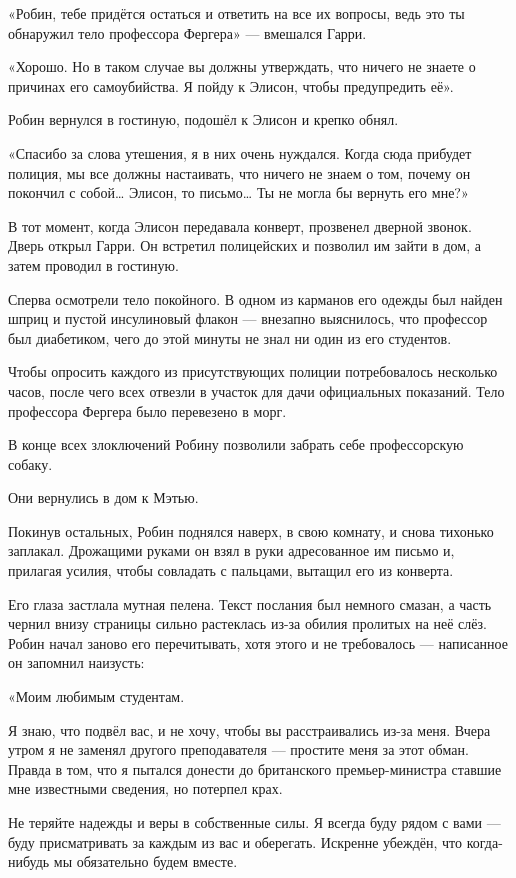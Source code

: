 \documentclass[a5paper, 9pt,
final, openany, twoside=true]{memoir}
\begin{document}
«Робин, тебе придётся остаться и ответить на все их вопросы, ведь это ты обнаружил тело профессора Фергера» — вмешался Гарри.

«Хорошо. Но в таком случае вы должны утверждать, что ничего не знаете о причинах его самоубийства. Я пойду к Элисон, чтобы предупредить её».

Робин вернулся в гостиную, подошёл к Элисон и крепко обнял.

«Спасибо за слова утешения, я в них очень нуждался. Когда сюда прибудет полиция, мы все должны настаивать, что ничего не знаем о том, почему он покончил с собой… Элисон, то письмо… Ты не могла бы вернуть его мне?»

В тот момент, когда Элисон передавала конверт, прозвенел дверной звонок. Дверь открыл Гарри. Он встретил полицейских и позволил им зайти в дом, а затем проводил в гостиную.

Сперва осмотрели тело покойного. В одном из карманов его одежды был найден шприц и пустой инсулиновый флакон — внезапно выяснилось, что профессор был диабетиком, чего до этой минуты не знал ни один из его студентов.

Чтобы опросить каждого из присутствующих полиции потребовалось несколько часов, после чего всех отвезли в участок для дачи официальных показаний. Тело профессора Фергера было перевезено в морг.

В конце всех злоключений Робину позволили забрать себе профессорскую собаку.\bigskip

Они вернулись в дом к Мэтью.

Покинув остальных, Робин поднялся наверх, в свою комнату, и снова тихонько заплакал. Дрожащими руками он взял в руки адресованное им письмо и, прилагая усилия, чтобы совладать с пальцами, вытащил его из конверта.

Его глаза застлала мутная пелена. Текст послания был немного смазан, а часть чернил внизу страницы сильно растеклась из-за обилия пролитых на неё слёз. Робин начал заново его перечитывать, хотя этого и не требовалось — написанное он запомнил наизусть:\bigskip

«Моим любимым студентам.\bigskip

Я знаю, что подвёл вас, и не хочу, чтобы вы расстраивались из-за меня. Вчера утром я не заменял другого преподавателя — простите меня за этот обман. Правда в том, что я пытался донести до британского премьер-министра ставшие мне известными сведения, но потерпел крах.

Не теряйте надежды и веры в собственные силы. Я всегда буду рядом с вами — буду присматривать за каждым из вас и оберегать. Искренне убеждён, что когда-нибудь мы обязательно будем вместе.
\end{document}

